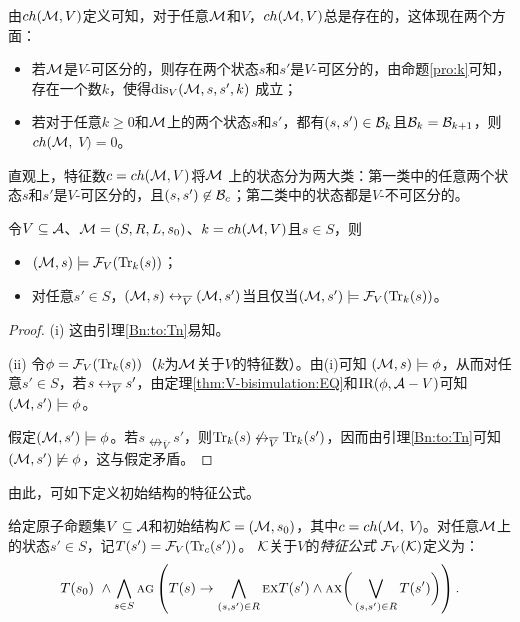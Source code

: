 由$ch({\cal M},V)$定义可知，对于任意${\cal M}$和$V$，$ch({\cal M},V)$总是存在的，这体现在两个方面：
\begin{itemize}
	\item[(1)] 若${\cal M}$是$V$-可区分的，则存在两个状态$s$和$s'$是$V$-可区分的，由命题\ref{pro:k}可知，存在一个数$k$，使得$\textrm{dis}_V({\cal M},s,s',k)$ 成立；
	\item[(2)] 若对于任意$k\geq 0$和${\cal M}$上的两个状态$s$和$s'$，都有$(s,s')\in {\cal B}_k$且${\cal B}_k ={\cal B}_{k+1}$，则$ch({\cal M},$ $V)=0$。
\end{itemize}

直观上，特征数$c=ch({\cal M},V)$将${\cal M}$ 上的状态分为两大类：第一类中的任意两个状态$s$和$s'$是$V$-可区分的，且$(s,s')\not \in {\cal B}_c$；第二类中的状态都是$V$-不可区分的。%

\begin{lemma}\label{div_s}
	令$V\subseteq {\cal A}$、${\cal M}=(S,R,L,s_0)$、$k={ch({\cal M},V)}$且$s\in S$，则
	\begin{itemize}
		\item[(i)] $({\cal M}, s)\models {\cal F}_V(\textrm{Tr}_k(s))$；
		\item[(ii)] 对任意$s'\in S$，$({\cal M},s) \leftrightarrow_{\overline V} ({\cal M},s')$当且仅当$({\cal M},s')\models{\cal F}_V(\textrm{Tr}_k(s))$。
	\end{itemize}
\end{lemma}
\begin{proof}
	(i) 这由引理\ref{Bn:to:Tn}易知。
	
	(ii) 令$\phi = {\cal F}_V(\textrm{Tr}_k(s))$（$k$为${\cal M}$关于$V$的特征数）。由(i)可知 $({\cal M}, s) \models \phi$，从而对任意$s' \in S$，若$s \leftrightarrow_{\overline V} s'$，由定理\ref{thm:V-bisimulation:EQ}和$\textrm{IR}(\phi, {\cal A} - V)$可知$({\cal M}, s') \models \phi$。
	
	假定$({\cal M}, s')\models \phi$。若$s \nleftrightarrow_{\overline V} s'$，则$\textrm{Tr}_k(s) \not \leftrightarrow_{\overline V} \textrm{Tr}_k(s')$，因而由引理\ref{Bn:to:Tn}可知$({\cal M}, s')\not \models \phi$，这与假定矛盾。
\end{proof}

由此，可如下定义初始结构的特征公式。

\begin{definition}[特征公式]
	给定原子命题集$V\subseteq\cal A$和初始结构${\cal K}=({\cal M},s_0)$，其中$c=ch({\cal M},$ $V)$。对任意${\cal M}$上的状态$s' \in S$，记$T(s') = {\cal F}_V(\textrm{Tr}_c(s'))$。
	$\cal K$关于$V$的{\em 特征公式} ${\cal F}_V({\cal K})$定义为：
	\[T(s_0) \text{ } \wedge \bigwedge_{s\in S}\textsc{a} \textsc{g}\left(
	T(s) \rightarrow
	\bigwedge_{(s,s')\in R}
	\textsc{e} \textsc{x} T(s')
	\wedge
	\textsc{a} \textsc{x} \bigg(\bigvee_{(s,s')\in R}T(s')\bigg)
	\right).
	\]
	
\end{definition}


